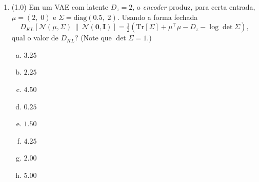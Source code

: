\documentclass[11pt,a4paper]{article}
\begin{document}
\begin{enumerate}[1)]
Com base na regra acima, qual afirmação descreve corretamente a verificação?

\begin{enumerate}[a)]
    \item Todo \textit{token} proposto que aparece entre os três mais prováveis do alvo é aceito; logo apenas a posição $5$ pode ser rejeitada na verificação.
    \item A posição $3$ é \emph{sempre} rejeitada (pois $p < q$): reamostra-se ``janela'' e descartam-se as posições $4$ e $5$ do rascunho.
    \item A posição $3$ é aceita com probabilidade $p/q = 0.8/0.2 = 1$ (sempre), bastando o \textit{token} estar entre os mais prováveis do alvo.
    \item As posições $1$ e $2$ são sempre aceitas ($p \ge q$); a posição $3$ ($p < q$) é aceita com probabilidade $p/q = 0.2/0.8 = 0.25$ e, se rejeitada, reamostrada de $(p-q)_+$ para ``janela'', descartando-se as posições $4$ e $5$.
    \item As posições $1$ e $2$ podem ser rejeitadas com probabilidade $p/q$; a posição $3$, por ter $p < q$, é a única sempre aceita do conjunto.
    \item Se rejeitada, a posição $3$ é reamostrada para ``porta'' (o \textit{token} do rascunho), e as posições $4$ e $5$ são reamostradas logo em seguida.
    \item Como $p < q$ nas posições $3$ e $5$, ambas são reamostradas de forma independente, gerando ``janela'' e ``nova'', respectivamente.
    \item Nenhuma posição pode ser aceita sem reamostragem, pois a regra de verificação exige que $p = q$ exatamente em cada posição.
\end{enumerate}


\pagebreak

\item (1.0) Em um VAE com latente $D_z = 2$, o \textit{encoder} produz, para certa entrada, $\mu = (2,\; 0)$ e $\Sigma = \mathrm{diag}(0.5,\; 2)$. Usando a forma fechada
\[
  D_{KL}\!\left[\mathcal{N}(\mu,\Sigma)\,\|\,\mathcal{N}(\mathbf{0},\mathbf{I})\right] = \tfrac{1}{2}\!\left(\mathrm{Tr}[\Sigma] + \mu^{\top}\mu - D_z - \log\det\Sigma\right),
\]
qual o valor de $D_{KL}$? (Note que $\det\Sigma = 1$.)

\begin{enumerate}[a)]
    \item $3.25$
    \item $2.25$
    \item $4.50$
    \item $0.25$
    \item $1.50$
    \item $4.25$
    \item $2.00$
    \item $5.00$
\end{enumerate}


\end{enumerate}
\end{document}
